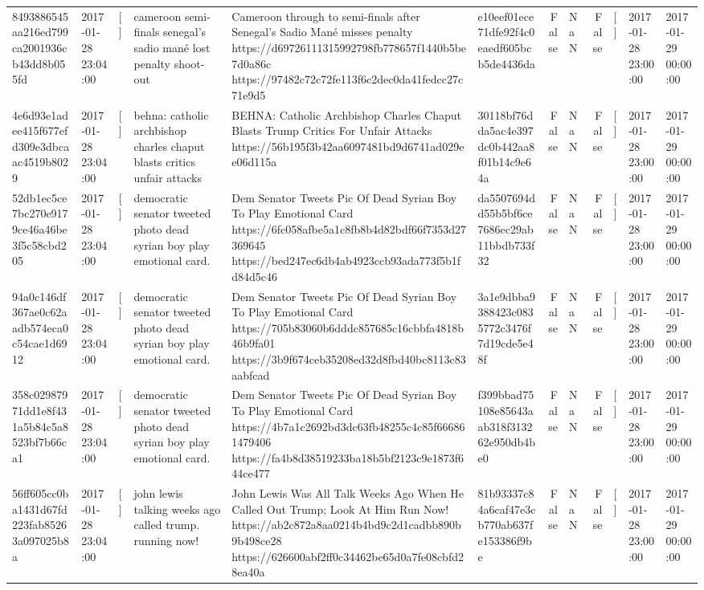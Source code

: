 \begin{tabular}{llllllrlrlll}
8493886545aa216ed799ca2001936cb43dd8b055fd & 2017-01-28 23:04:00 & [] & cameroon semi-finals senegal's sadio mané lost penalty shoot-out & Cameroon through to semi-finals after Senegal’s Sadio Mané misses penalty https://d69726111315992798fb778657f1440b5be7d0a86c https://97482c72c72fe113f6c2dec0da41fedcc27c71e9d5 & e10eef01ece71dfe92f4c0eaedf605bcb5de4436da & False & NaN & False & [] & 2017-01-28 23:00:00 & 2017-01-29 00:00:00 \\
4e6d93e1adee415f677efd309e3dbcaac4519b8029 & 2017-01-28 23:04:00 & [] & behna: catholic archbishop charles chaput blasts critics unfair attacks & BEHNA: Catholic Archbishop Charles Chaput Blasts Trump Critics For Unfair Attacks https://56b195f3b42aa6097481bd9d6741ad029ee06d115a & 30118bf76dda5ac4e397dc0b442aa8f01b14c9e64a & False & NaN & False & [] & 2017-01-28 23:00:00 & 2017-01-29 00:00:00 \\
52db1ec5ce7bc270e9179ce46a46be3f5c58cbd205 & 2017-01-28 23:04:00 & [] & democratic senator tweeted photo dead syrian boy play emotional card. & Dem Senator Tweets Pic Of Dead Syrian Boy To Play Emotional Card https://6fc058afbe5a1c8fb8b4d82bdf66f7353d27369645 https://bed247ec6db4ab4923ccb93ada773f5b1fd84d5c46 & da5507694dd55b5bf6ce7686ec29ab11bbdb733f32 & False & NaN & False & [] & 2017-01-28 23:00:00 & 2017-01-29 00:00:00 \\
94a0c146df367ae0c62aadb574eca0c54cae1d6912 & 2017-01-28 23:04:00 & [] & democratic senator tweeted photo dead syrian boy play emotional card. & Dem Senator Tweets Pic Of Dead Syrian Boy To Play Emotional Card https://705b83060b6dddc857685c16cbbfa4818b46b9fa01 https://3b9f674ceb35208ed32d8fbd40bc8113c83aabfcad & 3a1e9dbba9388423c0835772c3476f7d19cde5e48f & False & NaN & False & [] & 2017-01-28 23:00:00 & 2017-01-29 00:00:00 \\
358c02987971dd1e8f431a5b84c5a8523bf7b66ca1 & 2017-01-28 23:04:00 & [] & democratic senator tweeted photo dead syrian boy play emotional card. & Dem Senator Tweets Pic Of Dead Syrian Boy To Play Emotional Card https://4b7a1c2692bd3dc63fb48255c4c85f666861479406 https://fa4b8d38519233ba18b5bf2123c9e1873f644ce477 & f399bbad75108e85643aab318f313262e950db4be0 & False & NaN & False & [] & 2017-01-28 23:00:00 & 2017-01-29 00:00:00 \\
56ff605cc0ba1431d67fd223fab85263a097025b8a & 2017-01-28 23:04:00 & [] & john lewis talking weeks ago called trump. running now! & John Lewis Was All Talk Weeks Ago When He Called Out Trump; Look At Him Run Now! https://ab2c872a8aa0214b4bd9c2d1cadbb890b9b498ce28 https://626600abf2ff0c34462be65d0a7fe08cbfd28ea40a & 81b93337c84a6caf47e3cb770ab637fe153386f9be & False & NaN & False & [] & 2017-01-28 23:00:00 & 2017-01-29 00:00:00 \\

\end{tabular}
